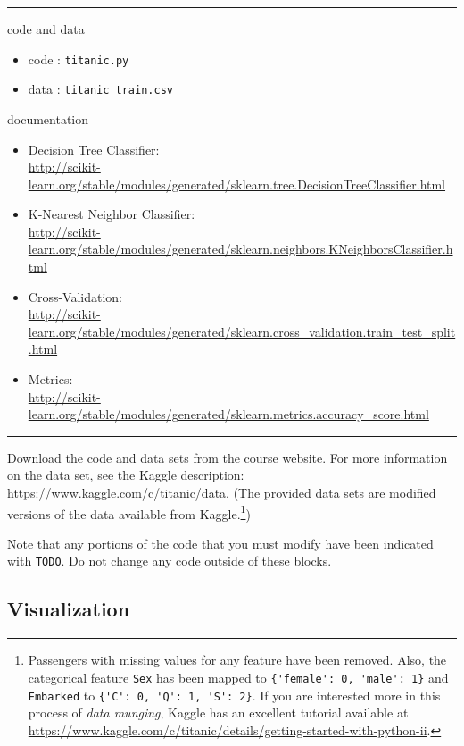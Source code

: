 \vspace{-\baselineskip}
\rule{\textwidth}{1pt}
code and data
\begin{itemize}[nolistsep]
\item code : \verb|titanic.py|
\item data : \verb|titanic_train.csv|
\end{itemize}
documentation
\begin{itemize}[nolistsep]
\item Decision Tree Classifier: \\{\footnotesize \url{http://scikit-learn.org/stable/modules/generated/sklearn.tree.DecisionTreeClassifier.html}}
\item K-Nearest Neighbor Classifier: \\{\footnotesize \url{http://scikit-learn.org/stable/modules/generated/sklearn.neighbors.KNeighborsClassifier.html}} 
\item Cross-Validation: \\{\footnotesize \url{http://scikit-learn.org/stable/modules/generated/sklearn.cross_validation.train_test_split.html}}
\item Metrics: \\{\footnotesize \url{http://scikit-learn.org/stable/modules/generated/sklearn.metrics.accuracy_score.html}}
\end{itemize}
\vspace{-\baselineskip}
\rule{\textwidth}{1pt}

Download the code and data sets from the course website. For more information on the data set, see the Kaggle description: \url{https://www.kaggle.com/c/titanic/data}. (The provided data sets are modified versions of the data available from Kaggle.\footnote{Passengers with missing values for any feature have been removed. Also, the categorical feature \verb|Sex| has been mapped to \verb|{'female': 0, 'male': 1}| and \verb|Embarked| to \verb|{'C': 0, 'Q': 1, 'S': 2}|. If you are interested more in this process of \emph{data munging}, Kaggle has an excellent tutorial available at \url{https://www.kaggle.com/c/titanic/details/getting-started-with-python-ii}.})

Note that any portions of the code that you must modify have been indicated with \verb|TODO|. Do not change any code outside of these blocks.
\fi

\subsection{Visualization }

